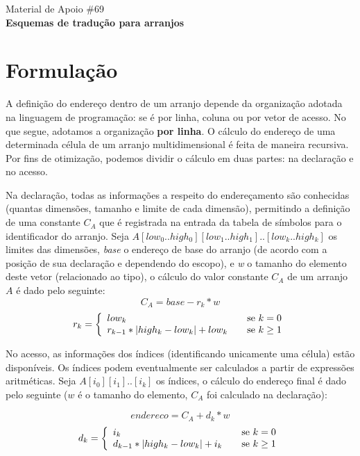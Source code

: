 \documentclass{compiladores}
\begin{document}
\begin{center}
{\LARGE Material de Apoio \#69} \\
{\bf Esquemas de tradução para arranjos}
\end{center}

\section{Formulação}

A definição do endereço dentro de um arranjo depende da organização
adotada na linguagem de programação: se é por linha, coluna ou por
vetor de acesso. No que segue, adotamos a organização {\bf por linha}.
O cálculo do endereço de uma determinada célula de um arranjo
multidimensional é feita de maneira recursiva. Por fins de otimização,
podemos dividir o cálculo em duas partes: na declaração e no acesso.

Na declaração, todas as informações a respeito do endereçamento são
conhecidas (quantas dimensões, tamanho e limite de cada dimensão),
permitindo a definição de uma constante $C_A$ que é registrada na
entrada da tabela de símbolos para o identificador do arranjo.  Seja
$A[low_0..high_0][low_1..high_1]..[low_k..high_k]$ os limites das
dimensões, \emph{base} o endereço de base do arranjo (de acordo com a
posição de sua declaração e dependendo do escopo), e \emph{w} o
tamanho do elemento deste vetor (relacionado ao tipo), o cálculo do
valor constante $C_A$ de um arranjo $A$ é dado pelo seguinte:
\begin{equation}
C_A = base - r_k * w
\end{equation}
\begin{equation}
r_k = \left\{ 
\begin{array}{l l}
low_k & \quad \text{se $k = 0$} \\
r_{k-1} * |high_k-low_k| + low_k & \quad \text{se $k \geq 1$}
\end{array} \right.
\end{equation}

No acesso, as informações dos índices (identificando unicamente uma
célula) estão disponíveis. Os índices podem eventualmente ser
calculados a partir de expressões aritméticas. Seja
$A[i_0][i_1]..[i_k]$ os índices, o cálculo do endereço final é dado
pelo seguinte ($w$ é o tamanho do elemento, $C_A$ foi calculado na
declaração):

\begin{equation}
endereco = C_A + d_k * w
\end{equation}
\begin{equation}
d_k = \left\{ 
\begin{array}{l l}
i_k & \quad \text{se $k = 0$} \\
d_{k-1} * |high_k-low_k| + i_k & \quad \text{se $k \geq 1$}
\end{array} \right.
\end{equation}
\end{document}
